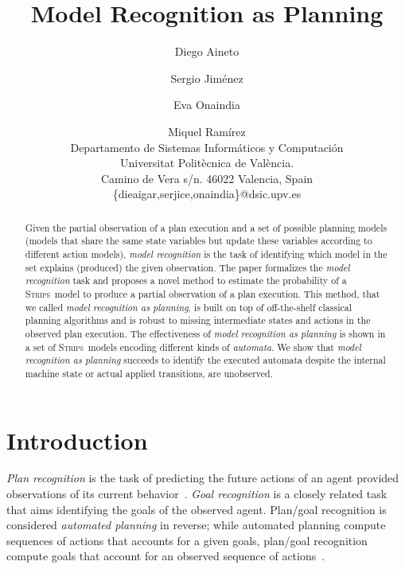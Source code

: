 \documentclass[letterpaper]{article} %
\newcommand{\strips}{\textsc{Strips}}     %
\begin{document}
\title{Model Recognition as Planning}

\author{Diego Aineto\and Sergio Jim\'enez\and Eva Onaindia \and Miquel Ram\'irez\\
{\small Departamento de Sistemas Inform\'aticos y Computaci\'on}\\
{\small Universitat Polit\`ecnica de Val\`encia.}\\
{\small Camino de Vera s/n. 46022 Valencia, Spain}\\
{\small \{dieaigar,serjice,onaindia\}@dsic.upv.es}}



\maketitle
\begin{abstract} 
Given the partial observation of a plan execution and a set of possible planning models (models that share the same state variables but update these variables according to different action models), {\em model recognition} is the task of identifying which model in the set explains (produced) the given observation. The paper formalizes the {\em model recognition} task and proposes a novel method to estimate the probability of a \strips\ model to produce a partial observation of a plan execution. This method, that we called {\em model recognition as planning}, is built on top of off-the-shelf classical planning algorithms and is robust to missing intermediate states and actions in the observed plan execution. The effectiveness of {\em model recognition as planning} is shown in a set of \strips\ models encoding different kinds of {\em automata}. We show that {\em model recognition as planning} succeeds to identify the executed automata despite the internal machine state or actual applied transitions, are unobserved.
\end{abstract}

\section{Introduction}
\label{sec:introduction}
{\em Plan recognition} is the task of predicting the future actions of an agent provided observations of its current behavior~\cite{carberry2001techniques}. {\em Goal recognition} is a closely related task that aims identifying the goals of the observed agent. Plan/goal recognition is considered {\em automated planning} in reverse; while automated planning compute sequences of actions that accounts for a given goals, plan/goal recognition compute goals that account for an observed sequence of actions~\cite{geffner:book:2013}.
\end{document}
